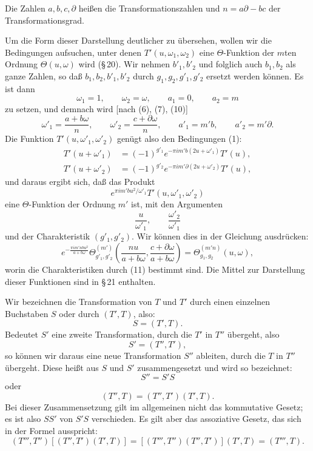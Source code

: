 \documentclass[11pt]{article}
\begin{document}
Die Zahlen $a,b,c,\partial$ heißen die Transformationszahlen und $n=a\partial-bc$ der Transformationsgrad.

Um die Form dieser Darstellung deutlicher zu übersehen, wollen wir die Bedingungen aufsuchen, unter denen $T'(u,\omega_1,\omega_2)$ eine $\Theta$-Funktion der $m$ten Ordnung $\Theta(u,\omega)$ wird (\S\,20). Wir nehmen $b'_1,b'_2$ und folglich auch $b_1,b_2$ als ganze Zahlen, so daß $b_1,b_2,b'_1,b'_2$ durch $g_1,g_2,g'_1,g'_2$ ersetzt werden können. Es ist dann
\[
\omega_1=1,
\qquad \omega_2=\omega,
\qquad a_1=0,
\qquad a_2=m
\]
zu setzen, und demnach wird [nach (6), (7), (10)]
\[
\omega'_1=\frac{a+b\omega}{n},
\qquad
\omega'_2=\frac{c+\partial\omega}{n},
\qquad
a'_1=m'b,
\qquad
a'_2=m'\partial.
\]
Die Funktion $T'(u,\omega'_1,\omega'_2)$ genügt also den Bedingungen (1):
\begin{align*}
T'(u+\omega'_1)&=(-1)^{g'_1}e^{-\pi i m'b(2u+\omega'_1)}T'(u),\\
T'(u+\omega'_2)&=(-1)^{g'_2}e^{-\pi i m'\partial(2u+\omega'_2)}T'(u),
\end{align*}
und daraus ergibt sich, daß das Produkt
\[
e^{\pi i m'bu^2/\omega'_1}T'(u,\omega'_1,\omega'_2)
\]
eine $\Theta$-Funktion der Ordnung $m'$ ist, mit den Argumenten
\[
\frac{u}{\omega'_1},
\qquad
\frac{\omega'_2}{\omega'_1}
\]
und der Charakteristik $(g'_1,g'_2)$. Wir können dies in der Gleichung ausdrücken:
\begin{equation}
e^{-\frac{\pi i m'nbu^2}{a+b\omega}}
\Theta_{g'_1,g'_2}^{(m')}
\left(\frac{nu}{a+b\omega},\frac{c+\partial\omega}{a+b\omega}\right)
=\Theta_{g_1,g_2}^{(m'n)}(u,\omega), \tag{12}
\end{equation}
worin die Charakteristiken durch (11) bestimmt sind. Die Mittel zur Darstellung dieser Funktionen sind in \S\,21 enthalten.

Wir bezeichnen die Transformation von $T$ und $T'$ durch einen einzelnen Buchstaben $S$ oder durch $(T',T)$, also:
\[
S=(T',T).
\]
Bedeutet $S'$ eine zweite Transformation, durch die $T'$ in $T''$ übergeht, also
\[
S'=(T'',T'),
\]
so können wir daraus eine neue Transformation $S''$ ableiten, durch die $T$ in $T''$ übergeht. Diese heißt aus $S$ und $S'$ zusammengesetzt und wird so bezeichnet:
\[
S''=S'S
\]
oder
\[
(T'',T)=(T'',T')(T',T).
\]
Bei dieser Zusammensetzung gilt im allgemeinen nicht das kommutative Gesetz; es ist also $SS'$ von $S'S$ verschieden. Es gilt aber das assoziative Gesetz, das sich in der Formel ausspricht:
\[
(T''',T'')[(T'',T')(T',T)]=[(T''',T'')(T'',T')](T',T)=(T''',T).
\]
\end{document}
